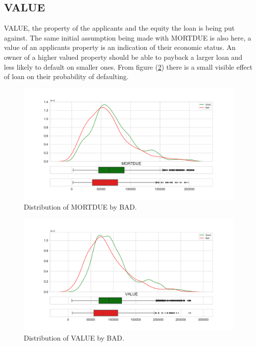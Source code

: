 \subsection*{VALUE}

VALUE, the property of the applicants and the equity the loan is being put against. The same initial assumption being made with MORTDUE is also here, a value of an applicants property is an indication of their economic status. An owner of a higher valued property should be able to payback a larger loan and less likely to default on smaller ones. From figure (\ref{value_dist}) there is a small visible effect of loan on their probability of defaulting.

\begin{figure}[!ht]
	\centering
	\includegraphics[scale=0.40]{figs/mortdue_dist.pdf}
	\caption{Distribution of MORTDUE by BAD. \label{mortdue_dist}}
\end{figure}

\begin{figure}[!ht]
	\centering
	\includegraphics[scale=0.40]{figs/value_dist.pdf}
	\caption{Distribution of VALUE by BAD. \label{value_dist}}
\end{figure}

